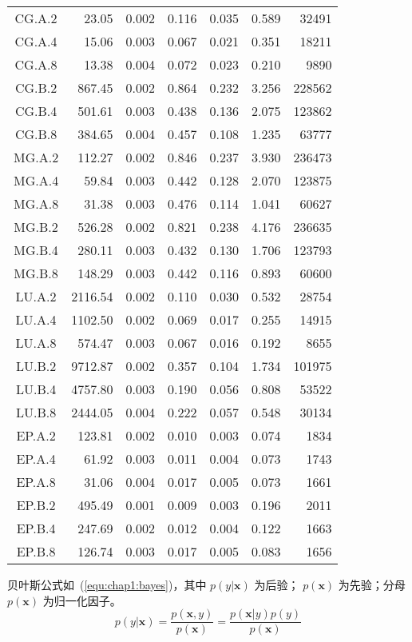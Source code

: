 \begin{longtable}[c]{c*{6}{r}}
\endfoot%
\endlastfoot%
CG.A.2 & 23.05   & 0.002 & 0.116 & 0.035 & 0.589 & 32491  \\
CG.A.4 & 15.06   & 0.003 & 0.067 & 0.021 & 0.351 & 18211  \\
CG.A.8 & 13.38   & 0.004 & 0.072 & 0.023 & 0.210 & 9890   \\
CG.B.2 & 867.45  & 0.002 & 0.864 & 0.232 & 3.256 & 228562 \\
CG.B.4 & 501.61  & 0.003 & 0.438 & 0.136 & 2.075 & 123862 \\
CG.B.8 & 384.65  & 0.004 & 0.457 & 0.108 & 1.235 & 63777  \\
MG.A.2 & 112.27  & 0.002 & 0.846 & 0.237 & 3.930 & 236473 \\
MG.A.4 & 59.84   & 0.003 & 0.442 & 0.128 & 2.070 & 123875 \\
MG.A.8 & 31.38   & 0.003 & 0.476 & 0.114 & 1.041 & 60627  \\
MG.B.2 & 526.28  & 0.002 & 0.821 & 0.238 & 4.176 & 236635 \\
MG.B.4 & 280.11  & 0.003 & 0.432 & 0.130 & 1.706 & 123793 \\
MG.B.8 & 148.29  & 0.003 & 0.442 & 0.116 & 0.893 & 60600  \\
LU.A.2 & 2116.54 & 0.002 & 0.110 & 0.030 & 0.532 & 28754  \\
LU.A.4 & 1102.50 & 0.002 & 0.069 & 0.017 & 0.255 & 14915  \\
LU.A.8 & 574.47  & 0.003 & 0.067 & 0.016 & 0.192 & 8655   \\
LU.B.2 & 9712.87 & 0.002 & 0.357 & 0.104 & 1.734 & 101975 \\
LU.B.4 & 4757.80 & 0.003 & 0.190 & 0.056 & 0.808 & 53522  \\
LU.B.8 & 2444.05 & 0.004 & 0.222 & 0.057 & 0.548 & 30134  \\
EP.A.2 & 123.81  & 0.002 & 0.010 & 0.003 & 0.074 & 1834   \\
EP.A.4 & 61.92   & 0.003 & 0.011 & 0.004 & 0.073 & 1743   \\
EP.A.8 & 31.06   & 0.004 & 0.017 & 0.005 & 0.073 & 1661   \\
EP.B.2 & 495.49  & 0.001 & 0.009 & 0.003 & 0.196 & 2011   \\
EP.B.4 & 247.69  & 0.002 & 0.012 & 0.004 & 0.122 & 1663   \\
EP.B.8 & 126.74  & 0.003 & 0.017 & 0.005 & 0.083 & 1656   \\
\bottomrule[1.5pt]
\end{longtable}

贝叶斯公式如~(\ref{equ:chap1:bayes})，其中 $p(y|\mathbf{x})$ 为后验；
$p(\mathbf{x})$ 为先验；分母 $p(\mathbf{x})$ 为归一化因子。
\begin{equation}
\label{equ:chap1:bayes}
p(y|\mathbf{x}) = \frac{p(\mathbf{x},y)}{p(\mathbf{x})}=
\frac{p(\mathbf{x}|y)p(y)}{p(\mathbf{x})} 
\end{equation}

